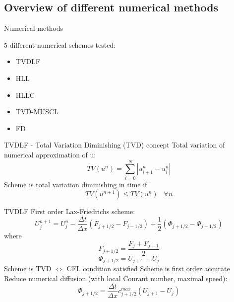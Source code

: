 \subsection{Overview of different numerical methods}
\begin{frame}{Numerical methods}

\vspace{2cm}
5 different numerical schemes tested:
\begin{itemize}
  	\item TVDLF
  	\item  HLL
  	\item HLLC
  	\item TVD-MUSCL 
  	\item FD
\end{itemize}

\end{frame}



\begin{frame}{TVDLF - Total Variation Diminishing (TVD) concept}
	Total variation of numerical approximation of u:
	\begin{equation*}
		TV(u^n) = \sum_{i=0}^{N} |u_{i+1}^n-u_i^n|
	\end{equation*}
	Scheme is total variation diminishing in time if
	\begin{equation*}
		TV(u^{n+1}) \leq TV(u^{n}) \; \; \; \forall n
	\end{equation*}
\end{frame}


\begin{frame}{TVDLF}
	First order Lax-Friedrichs scheme:
	\begin{equation*}
		U_j^{n+1} = U_j^n - \frac{\Delta t}{\Delta x} \left( F_{j+1/2} - F_{j-1/2} \right) + \frac{1}{2} \left( \Phi_{j+1/2} - \Phi_{j-1/2} \right)
	\end{equation*}
	where
	\begin{equation*}
		F_{j+1/2} = \frac{F_j + F_{j+1}}{2}
	\end{equation*}
	\begin{equation*}
		\Phi_{j+1/2} = U_{j+1}-U_j
	\end{equation*}
	Scheme is TVD $\Leftrightarrow$ CFL condition satisfied \newline
	Scheme is first order accurate \newline
	Reduce numerical diffusion (with local Courant number, maximal speed):
	\begin{equation*}
		\Phi_{j+1/2} = \frac{\Delta t}{\Delta x} c_{j+1/2}^{max} \left( U_{j+1}-U_j \right)
	\end{equation*}
\end{frame}
	
